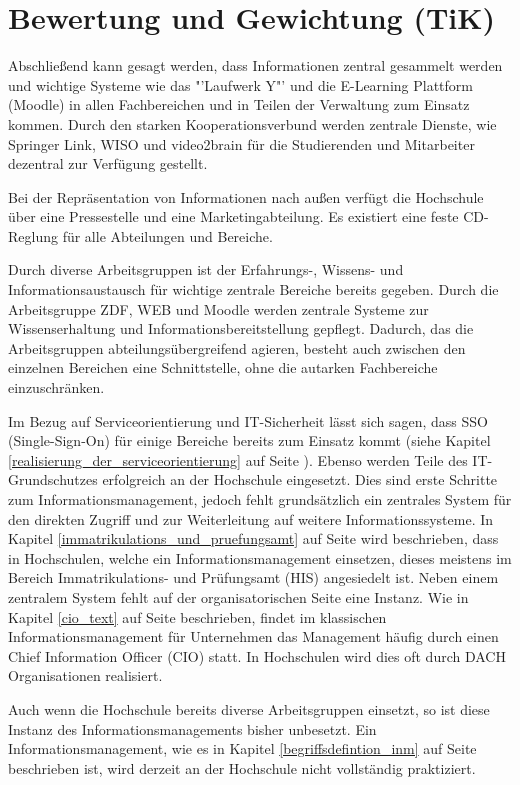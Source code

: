 \section{Bewertung und Gewichtung (TiK)}
Abschließend kann gesagt werden, dass Informationen zentral gesammelt werden und wichtige Systeme wie das "'Laufwerk Y"' und die E-Learning Plattform (Moodle) in allen Fachbereichen und in Teilen der Verwaltung zum Einsatz kommen. Durch den starken Kooperationsverbund werden zentrale Dienste, wie Springer Link, WISO und video2brain für die Studierenden und Mitarbeiter dezentral zur Verfügung gestellt. 

Bei der Repräsentation von Informationen nach außen verfügt die Hochschule über eine Pressestelle und eine Marketingabteilung. Es existiert eine feste CD-Reglung für alle Abteilungen und Bereiche. 

Durch diverse Arbeitsgruppen ist der Erfahrungs-, Wissens- und Informationsaustausch für wichtige zentrale Bereiche bereits gegeben. Durch die Arbeitsgruppe ZDF, WEB und Moodle werden zentrale Systeme zur Wissenserhaltung und Informationsbereitstellung gepflegt. Dadurch, das die Arbeitsgruppen abteilungsübergreifend agieren, besteht auch zwischen den einzelnen Bereichen eine Schnittstelle, ohne die autarken Fachbereiche einzuschränken. 

Im Bezug auf Serviceorientierung und IT-Sicherheit lässt sich sagen, dass SSO (Single-Sign-On) für einige Bereiche bereits zum Einsatz kommt (siehe Kapitel \ref{realisierung_der_serviceorientierung} auf Seite \pageref{realisierung_der_serviceorientierung}). Ebenso werden Teile des IT-Grundschutzes erfolgreich an der Hochschule eingesetzt. Dies sind erste Schritte zum Informationsmanagement, jedoch fehlt grundsätzlich ein zentrales System für den direkten Zugriff und zur Weiterleitung auf weitere Informationssysteme. In Kapitel \ref{immatrikulations_und_pruefungsamt} auf Seite \pageref{immatrikulations_und_pruefungsamt} wird beschrieben, dass in Hochschulen, welche ein Informationsmanagement einsetzen, dieses meistens im Bereich Immatrikulations- und Prüfungsamt (HIS) angesiedelt ist. 
Neben einem  zentralem System fehlt auf der organisatorischen Seite eine Instanz. Wie in Kapitel \ref{cio_text} auf Seite \pageref{cio_text} beschrieben, findet im klassischen Informationsmanagement für Unternehmen das Management häufig durch einen Chief Information Officer (CIO) statt. In Hochschulen wird dies oft durch DACH Organisationen realisiert. 

Auch wenn die Hochschule bereits diverse Arbeitsgruppen einsetzt, so ist diese Instanz des Informationsmanagements bisher unbesetzt. Ein Informationsmanagement, wie es in Kapitel \ref{begriffsdefintion_inm} auf Seite \pageref{begriffsdefintion_inm} beschrieben ist, wird derzeit an der Hochschule nicht vollständig praktiziert.